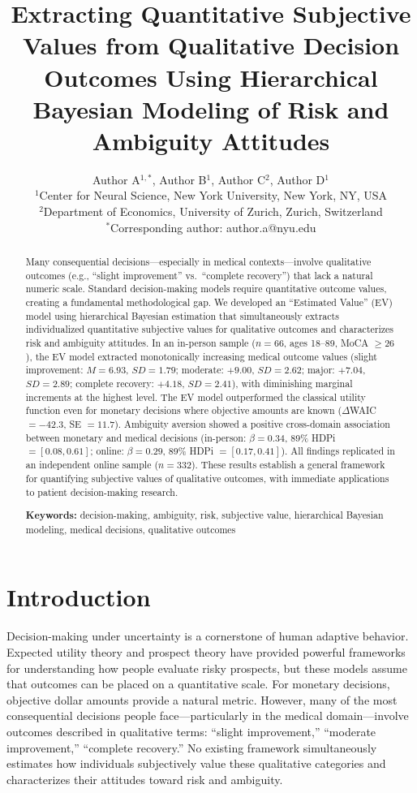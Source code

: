 \documentclass[11pt]{article}
\title{Extracting Quantitative Subjective Values from Qualitative Decision Outcomes Using Hierarchical Bayesian Modeling of Risk and Ambiguity Attitudes}
\author{%
  Author A$^{1,*}$, Author B$^{1}$, Author C$^{2}$, Author D$^{1}$ \\[6pt]
  $^{1}$Center for Neural Science, New York University, New York, NY, USA \\
  $^{2}$Department of Economics, University of Zurich, Zurich, Switzerland \\
  $^{*}$Corresponding author: author.a@nyu.edu
}
\date{}
\begin{document}
\maketitle

\begin{abstract}
Many consequential decisions---especially in medical contexts---involve qualitative outcomes (e.g., ``slight improvement'' vs.\ ``complete recovery'') that lack a natural numeric scale. Standard decision-making models require quantitative outcome values, creating a fundamental methodological gap. We developed an ``Estimated Value'' (EV) model using hierarchical Bayesian estimation that simultaneously extracts individualized quantitative subjective values for qualitative outcomes and characterizes risk and ambiguity attitudes. In an in-person sample ($n = 66$, ages 18--89, MoCA $\geq 26$), the EV model extracted monotonically increasing medical outcome values (slight improvement: $M = 6.93$, $SD = 1.79$; moderate: $+9.00$, $SD = 2.62$; major: $+7.04$, $SD = 2.89$; complete recovery: $+4.18$, $SD = 2.41$), with diminishing marginal increments at the highest level. The EV model outperformed the classical utility function even for monetary decisions where objective amounts are known ($\Delta$WAIC $= -42.3$, SE $= 11.7$). Ambiguity aversion showed a positive cross-domain association between monetary and medical decisions (in-person: $\beta = 0.34$, 89\% HDPi $= [0.08, 0.61]$; online: $\beta = 0.29$, 89\% HDPi $= [0.17, 0.41]$). All findings replicated in an independent online sample ($n = 332$). These results establish a general framework for quantifying subjective values of qualitative outcomes, with immediate applications to patient decision-making research.

\medskip
\noindent\textbf{Keywords:} decision-making, ambiguity, risk, subjective value, hierarchical Bayesian modeling, medical decisions, qualitative outcomes
\end{abstract}

\section{Introduction}

Decision-making under uncertainty is a cornerstone of human adaptive behavior. Expected utility theory \citep{savage1954foundations} and prospect theory \citep{kahneman1979prospect, tversky1992advances} have provided powerful frameworks for understanding how people evaluate risky prospects, but these models assume that outcomes can be placed on a quantitative scale. For monetary decisions, objective dollar amounts provide a natural metric. However, many of the most consequential decisions people face---particularly in the medical domain---involve outcomes described in qualitative terms: ``slight improvement,'' ``moderate improvement,'' ``complete recovery.'' No existing framework simultaneously estimates how individuals subjectively value these qualitative categories and characterizes their attitudes toward risk and ambiguity.
\end{document}
